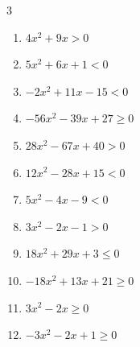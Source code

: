 \begin{multicols}{3}
\begin{enumerate}

  \item $4x^{2}+9x>0$


  \item $5x^{2}+6x+1<0$


  \item $-2x^{2}+11x-15<0$


  \item $-56x^{2}-39x+27\geq 0$


  \item $28x^{2}-67x+40>0$


  \item $12x^{2}-28x+15<0$


  \item $5x^{2}-4x-9<0$


  \item $3x^{2}-2x-1>0$


\columnbreak %

\resetques

  \item $18x^{2}+29x+3\leq 0$


  \item $-18x^{2}+13x+21\geq 0$


  \item $3x^{2}-2x\geq 0$


  \item $-3x^{2}-2x+1\geq 0$


\end{enumerate}
\end{multicols}
